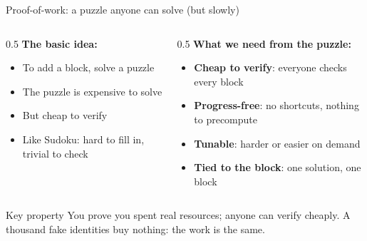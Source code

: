 \ifdefined\PRESENTATION\else\PassOptionsToClass{handout}{beamer}\fi\documentclass[aspectratio=169, lualatex]{beamer}
\begin{document}
\begin{frame}{Proof-of-work: a puzzle anyone can solve (but slowly)}
	\begin{columns}[c]
		\begin{column}{0.5\textwidth}
			\textbf{The basic idea:}
			\begin{itemize}
				\item To add a block, solve a puzzle
				\item The puzzle is expensive to solve
				\item But cheap to verify
				\item Like Sudoku: hard to fill in, trivial to check
			\end{itemize}
		\end{column}
		\begin{column}{0.5\textwidth}
			\textbf{What we need from the puzzle:}
			\begin{itemize}
				\item \textbf{Cheap to verify}: everyone checks every block
				\item \textbf{Progress-free}: no shortcuts, nothing to precompute
				\item \textbf{Tunable}: harder or easier on demand
				\item \textbf{Tied to the block}: one solution, one block
			\end{itemize}
		\end{column}
	\end{columns}
	\begin{alertblock}{Key property}
		You prove you spent real resources; anyone can verify cheaply. A thousand fake identities buy nothing: the work is the same.
	\end{alertblock}
\end{frame}
\end{document}
